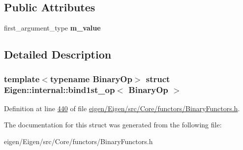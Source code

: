 \subsection*{Public Attributes}
\begin{DoxyCompactItemize}
\item 
\mbox{\label{struct_eigen_1_1internal_1_1bind1st__op_a44102df580616a3ca34b6623abbf65d4}} 
first\+\_\+argument\+\_\+type {\bfseries m\+\_\+value}
\end{DoxyCompactItemize}


\subsection{Detailed Description}
\subsubsection*{template$<$typename Binary\+Op$>$\newline
struct Eigen\+::internal\+::bind1st\+\_\+op$<$ Binary\+Op $>$}



Definition at line \hyperlink{eigen_2_eigen_2src_2_core_2functors_2_binary_functors_8h_source_l00440}{440} of file \hyperlink{eigen_2_eigen_2src_2_core_2functors_2_binary_functors_8h_source}{eigen/\+Eigen/src/\+Core/functors/\+Binary\+Functors.\+h}.



The documentation for this struct was generated from the following file\+:\begin{DoxyCompactItemize}
\item 
eigen/\+Eigen/src/\+Core/functors/\+Binary\+Functors.\+h\end{DoxyCompactItemize}
